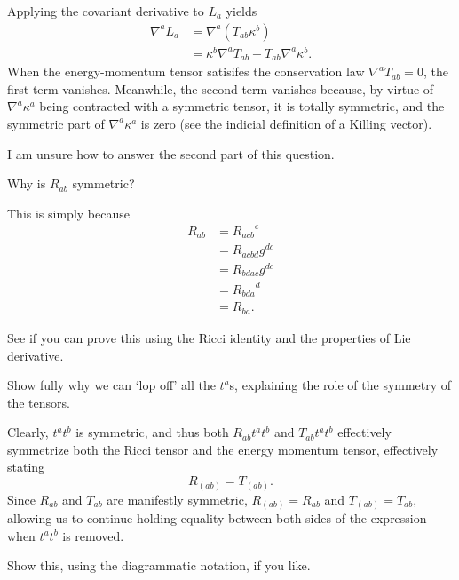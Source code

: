 \documentclass[../road-to-reality.tex]{subfiles}
\begin{document}
\begin{questions}
  \begin{solution}
    Applying the covariant derivative to $L_a$ yields
    \begin{align*}
      \nabla^aL_a &= \nabla^a(T_{ab}\kappa^b) \\
                  &= \kappa^b\nabla^aT_{ab} + T_{ab}\nabla^a\kappa^b.
    \end{align*}
    When the energy-momentum tensor satisifes the conservation law
    $\nabla^aT_{ab}=0$, the first term vanishes. Meanwhile, the second term
    vanishes because, by virtue of $\nabla^a\kappa^a$ being contracted with a
    symmetric tensor, it is totally symmetric, and the symmetric part of
    $\nabla^a\kappa^a$ is zero (see the indicial definition of a Killing vector).

    I am unsure how to answer the second part of this question.
  \end{solution}

\question Why is $R_{ab}$ symmetric?

  \begin{solution}
    This is simply because
    \begin{align*}
      R_{ab} &= {R_{acb}}^c \\
             &= R_{acbd}g^{dc} \\
             &= R_{bdac}g^{dc} \\
             &= {R_{bda}}^d \\
             &= R_{ba}.
    \end{align*}
  \end{solution}

\question See if you can prove this using the Ricci identity and the
  properties of Lie derivative.

\question Show fully why we can `lop off' all the $t^a$s, explaining the role
  of the symmetry of the tensors.

  \begin{solution}
    Clearly, $t^at^b$ is symmetric, and thus both $R_{ab}t^at^b$ and
    $T_{ab}t^at^b$ effectively symmetrize both the Ricci tensor and the energy
    momentum tensor, effectively stating
    \[
      R_{(ab)} = T_{(ab)}.
    \]
    Since $R_{ab}$ and $T_{ab}$ are manifestly symmetric, $R_{(ab)}=R_{ab}$ and
    $T_{(ab)}=T_{ab}$, allowing us to continue holding equality between both
    sides of the expression when $t^at^b$ is removed.
  \end{solution}

\question Show this, using the diagrammatic notation, if you like.


\end{questions}
\end{document}
